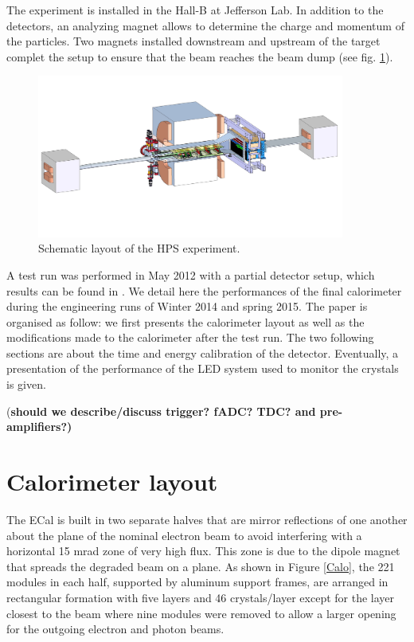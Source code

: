 \documentclass[review]{elsarticle}
\begin{document}
The experiment is installed in the Hall-B at Jefferson Lab. In addition to 
the detectors, an analyzing magnet allows to determine the charge and 
momentum of the particles. Two magnets installed downstream and upstream 
of the target complet the setup to ensure that the beam reaches the beam dump 
(see fig. \ref{intro:HPSScheme}).

\nopagebreak
\begin{figure}[htb]
  \begin{center}
     \includegraphics[angle=0, width=0.9\textwidth]{HPS_pic.jpg}
    \caption{Schematic layout of the HPS experiment.}
    \label{intro:HPSScheme}
  \end{center}
\end{figure}


A test run was performed in May 2012 with a partial detector setup, which 
results can be found in \cite{HPSTestRun}. We detail here the performances 
of the final calorimeter during the engineering runs of Winter 2014 and 
spring 2015. The paper is organised as follow: we first presents the 
calorimeter layout as well as the modifications made to the calorimeter 
after the test run. The two following sections are about the time and 
energy calibration of the detector. Eventually, a presentation of the 
performance of the LED system used to monitor the crystals is given.

{(\bf should we describe/discuss trigger? fADC? TDC? and pre-amplifiers?)}

\section{Calorimeter layout}

The ECal is built in two separate halves that are mirror reflections of 
one another about the plane of the nominal electron beam to avoid 
interfering with a horizontal 15 mrad zone of very high flux. This zone is 
due to the dipole magnet that spreads the degraded beam on a plane. As 
shown in Figure \ref{Calo}, the 221 modules in each half, supported by 
aluminum support frames, are arranged in rectangular formation with five 
layers and 46 crystals/layer except for the layer closest to the beam 
where nine modules were removed to allow a larger opening for the outgoing 
electron and photon beams. 
\end{document}
